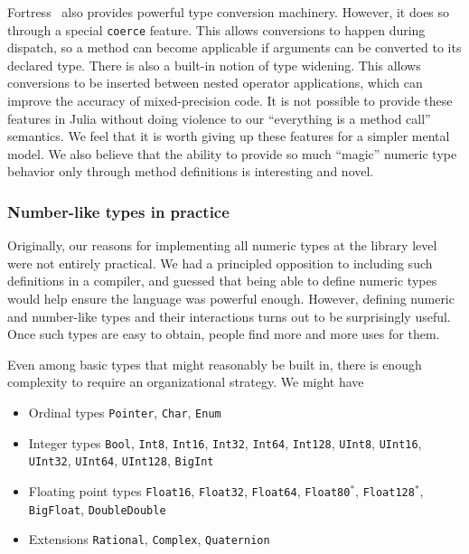Fortress~\cite{fortresspec} also provides powerful type conversion
machinery.
However, it does so through a special \texttt{coerce} feature.
This allows conversions to happen during dispatch, so a method can
become applicable if arguments can be converted to its declared type.
There is also a built-in notion of type widening.
This allows conversions to be inserted between nested operator
applications, which can improve the accuracy of mixed-precision code.
It is not possible to provide these features in Julia without doing
violence to our ``everything is a method call'' semantics.
We feel that it is worth giving up these features for a simpler
mental model.
We also believe that the ability to provide so much ``magic'' numeric
type behavior only through method definitions is interesting and novel.

\subsubsection{Number-like types in practice}

Originally, our reasons for implementing all numeric types at the library
level were not entirely practical.
We had a principled opposition to including such definitions in a compiler,
and guessed that being able to define numeric types would help ensure the
language was powerful enough.
However, defining numeric and number-like types and their interactions turns
out to be surprisingly useful.
Once such types are easy to obtain, people find more and more uses for them.

Even among basic types that might reasonably be built in, there is enough
complexity to require an organizational strategy.
We might have

\begin{itemize}
  \item Ordinal types \texttt{Pointer}, \texttt{Char}, \texttt{Enum}

  \item Integer types \texttt{Bool}, \texttt{Int8}, \texttt{Int16}, \texttt{Int32}, \texttt{Int64}, \texttt{Int128}, \texttt{UInt8}, \texttt{UInt16}, \texttt{UInt32}, \texttt{UInt64}, \texttt{UInt128}, \texttt{BigInt}

  \item Floating point types \texttt{Float16}, \texttt{Float32}, \texttt{Float64}, \texttt{Float80}$^*$, \texttt{Float128}$^*$, \texttt{BigFloat}, \texttt{DoubleDouble}

  \item Extensions \texttt{Rational}, \texttt{Complex}, \texttt{Quaternion}
\end{itemize}

